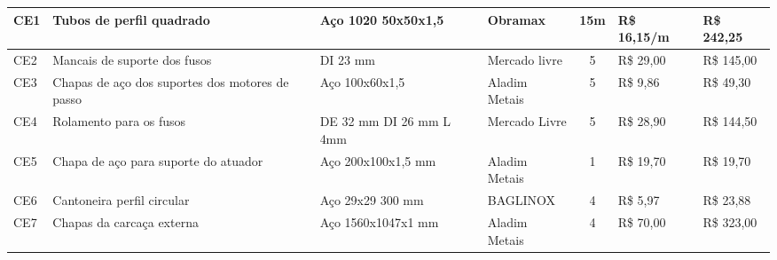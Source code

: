 \begin{table}[H]
\begin{adjustbox}{max width = 1\textwidth}
\begin{tabular}{|l|G{4cm}|C{2.4cm}|L{3.2cm}|c|l|l|}
        CE1 & Tubos de perfil quadrado  & Aço 1020 50x50x1,5 & Obramax & 15m & R\$ 16,15/m & R\$ 242,25  \\ \hline
        CE2 & Mancais de suporte dos fusos & DI 23 mm  & Mercado livre & 5 & R\$ 29,00 & R\$ 145,00 \\ \hline
        CE3 & Chapas de aço dos suportes dos motores de passo & Aço 100x60x1,5  & Aladim Metais & 5 & R\$ 9,86  & R\$ 49,30  \\ \hline
        CE4 & Rolamento para os fusos  & DE 32 mm DI 26 mm L 4mm & Mercado Livre & 5 & R\$ 28,90 & R\$  144,50 \\ \hline
        CE5 & Chapa de aço para suporte do atuador & Aço 200x100x1,5 mm & Aladim Metais  & 1  & R\$ 19,70 & R\$ 19,70 \\ \hline
        CE6 & Cantoneira perfil circular & Aço 29x29 300 mm & BAGLINOX & 4 & R\$ 5,97 & R\$ 23,88  \\ \hline
        CE7 & Chapas da carcaça externa & Aço 1560x1047x1 mm& Aladim Metais & 4 & R\$ 70,00 & R\$ 323,00  \\ \hline
        \end{tabular}
	\end{adjustbox}
\end{table}

